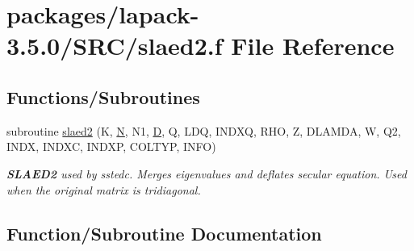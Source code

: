 \hypertarget{slaed2_8f}{}\section{packages/lapack-\/3.5.0/\+S\+R\+C/slaed2.f File Reference}
\label{slaed2_8f}
\subsection*{Functions/\+Subroutines}
\begin{DoxyCompactItemize}
\item 
subroutine \hyperlink{slaed2_8f_a836bec3df03c0b526715985d3002749e}{slaed2} (K, \hyperlink{polmisc_8c_a0240ac851181b84ac374872dc5434ee4}{N}, N1, \hyperlink{odrpack_8h_a7dae6ea403d00f3687f24a874e67d139}{D}, Q, L\+D\+Q, I\+N\+D\+X\+Q, R\+H\+O, Z, D\+L\+A\+M\+D\+A, W, Q2, I\+N\+D\+X, I\+N\+D\+X\+C, I\+N\+D\+X\+P, C\+O\+L\+T\+Y\+P, I\+N\+F\+O)
\begin{DoxyCompactList}\small\item\em {\bfseries S\+L\+A\+E\+D2} used by sstedc. Merges eigenvalues and deflates secular equation. Used when the original matrix is tridiagonal. \end{DoxyCompactList}\end{DoxyCompactItemize}


\subsection{Function/\+Subroutine Documentation}
\hypertarget{slaed2_8f_a836bec3df03c0b526715985d3002749e}{}
